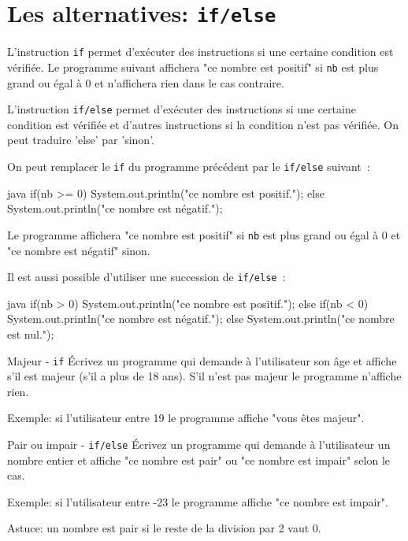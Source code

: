 \documentclass[a4paper,11pt]{style-esi/td}
\begin{document}


\section{Les alternatives: \texttt{if/else}}

L'instruction \texttt{if} permet d'exécuter des instructions si une certaine condition est vérifiée.
Le programme suivant affichera "ce nombre est positif"
si \texttt{nb} est plus grand ou égal à 0 et n'affichera rien dans le cas contraire.


L'instruction \texttt{if/else} permet d'exécuter des instructions si une certaine condition est vérifiée
et d'autres instructions si la condition n'est pas vérifiée. On peut traduire 'else' par 'sinon'.

On peut remplacer le \texttt{if} du programme précédent par le \texttt{if/else} suivant~:

\begin{Code}[basicstyle=\small\vtt]{java}
	if(nb >= 0) {
		System.out.println("ce nombre est positif.");
	} else {
		System.out.println("ce nombre est négatif.");
	}
\end{Code}

Le programme affichera "ce nombre est positif"
si \texttt{nb} est plus grand ou égal à 0 et "ce nombre est négatif" sinon.


Il est aussi possible d'utiliser une succession de \texttt{if/else}~:

\begin{Code}[basicstyle=\small\vtt]{java}
	if(nb > 0) {
		System.out.println("ce nombre est positif.");
	} else if(nb < 0) {
		System.out.println("ce nombre est négatif.");
	} else {
		System.out.println("ce nombre est nul.");
	}
\end{Code}


\begin{Exercice}{Majeur - \texttt{if}}
	\'Ecrivez un programme qui demande à l'utilisateur
	son âge et affiche s'il est majeur (s'il a plus de 18 ans).
	S'il n'est pas majeur le programme n'affiche rien.

	Exemple: si l'utilisateur entre 19 le programme affiche "vous êtes majeur".
\end{Exercice}

\begin{Exercice}{Pair ou impair - \texttt{if/else}}
	\'Ecrivez un programme qui demande à l'utilisateur
	un nombre entier et affiche "ce nombre est pair" ou "ce nombre est impair" selon le cas.

	Exemple: si l'utilisateur entre -23 le programme affiche "ce nombre est impair".

	Astuce: un nombre est pair si le reste de la division par 2 vaut 0.
\end{Exercice}
\end{document}
